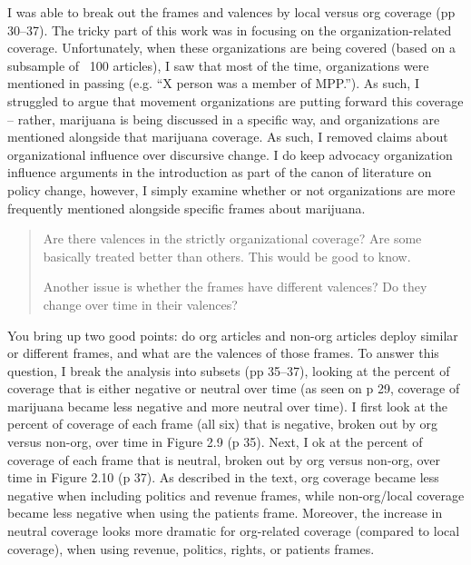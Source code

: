 \documentclass[12pt,stdletter,dateno,sigleft]{newlfm} %
\begin{document}
\begin{newlfm}
I was able to break out the frames and valences by local versus org coverage (pp 30--37). The tricky part of this work was in focusing on the organization-related coverage. Unfortunately, when these organizations are being covered (based on a subsample of ~100 articles), I saw that most of the time, organizations were mentioned in passing (e.g. ``X person was a member of MPP.''). As such, I struggled to argue that movement organizations are putting forward this coverage -- rather, marijuana is being discussed in a specific way, and organizations are mentioned alongside that marijuana coverage. As such, I removed claims about organizational influence over discursive change. I do keep advocacy organization influence arguments in the introduction as part of the canon of literature on policy change, however, I simply examine whether or not organizations are more frequently mentioned alongside specific frames about marijuana. 




\begin{quotation}{\color{red}\noindent \footnotesize
Are there valences in the strictly organizational coverage?  Are some basically treated better than others.  This would be good to know.\newline

\noindent Another issue is whether the frames have different valences?  Do they change over time in their valences? 
}
\end{quotation}

You bring up two good points: do org articles and non-org articles deploy similar or different frames, and what are the valences of those frames. To answer this question, I break the analysis into subsets (pp 35--37), looking at the percent of coverage that is either negative or neutral over time (as seen on p 29, coverage of marijuana became less negative and more neutral over time). I first look at the percent of coverage of each frame (all six) that is negative, broken out by org versus non-org, over time in Figure 2.9 (p 35). Next, I ok at the percent of coverage of each frame that is neutral, broken out by org versus non-org, over time in Figure 2.10 (p 37). As described in the text, org coverage became less negative when including politics and revenue frames, while non-org/local coverage became less negative when using the patients frame. Moreover, the increase in neutral coverage looks more dramatic for org-related coverage (compared to local coverage), when using revenue, politics, rights, or patients frames. \newline


\end{newlfm}
\end{document}
